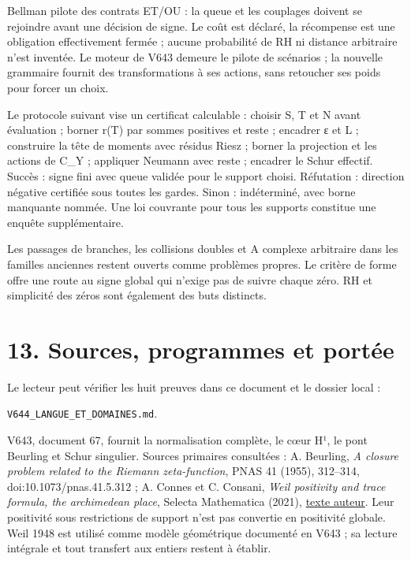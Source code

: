 \documentclass[
  10pt,
  a4paper,
]{article}
\begin{document}
Bellman pilote des contrats ET/OU : la queue et les couplages doivent se
rejoindre avant une décision de signe. Le coût est déclaré, la
récompense est une obligation effectivement fermée ; aucune probabilité
de RH ni distance arbitraire n'est inventée. Le moteur de V643 demeure
le pilote de scénarios ; la nouvelle grammaire fournit des
transformations à ses actions, sans retoucher ses poids pour forcer un
choix.

Le protocole suivant vise un certificat calculable : choisir S, T et N
avant évaluation ; borner r(T) par sommes positives et reste ; encadrer
ε et L ; construire la tête de moments avec résidus Riesz ; borner la
projection et les actions de C\_Y ; appliquer Neumann avec reste ;
encadrer le Schur effectif. Succès : signe fini avec queue validée pour
le support choisi. Réfutation : direction négative certifiée sous toutes
les gardes. Sinon : indéterminé, avec borne manquante nommée. Une loi
couvrante pour tous les supports constitue une enquête supplémentaire.

Les passages de branches, les collisions doubles et A complexe
arbitraire dans les familles anciennes restent ouverts comme problèmes
propres. Le critère de forme offre une route au signe global qui n'exige
pas de suivre chaque zéro. RH et simplicité des zéros sont également des
buts distincts.

\newpage

\hypertarget{sources-programmes-et-portuxe9e}{%
\section{13. Sources, programmes et
portée}\label{sources-programmes-et-portuxe9e}}

Le lecteur peut vérifier les huit preuves dans ce document et le dossier
local :

\texttt{V644\_LANGUE\_ET\_DOMAINES.md}.

V643, document 67, fournit la normalisation complète, le cœur H¹, le
pont Beurling et Schur singulier. Sources primaires consultées : A.
Beurling, \emph{A closure problem related to the Riemann zeta-function},
PNAS 41 (1955), 312--314, doi:10.1073/pnas.41.5.312 ; A. Connes et C.
Consani, \emph{Weil positivity and trace formula, the archimedean
place}, Selecta Mathematica (2021),
\href{https://alainconnes.org/wp-content/uploads/Selecta.pdf}{texte
auteur}. Leur positivité sous restrictions de support n'est pas
convertie en positivité globale. Weil 1948 est utilisé comme modèle
géométrique documenté en V643 ; sa lecture intégrale et tout transfert
aux entiers restent à établir.
\end{document}
